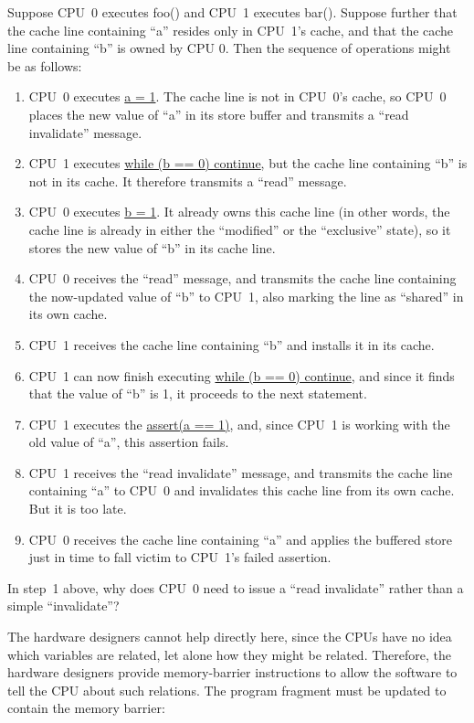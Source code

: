 Suppose CPU~0 executes foo() and CPU~1 executes bar().
Suppose further that the cache line containing ``a'' resides only in CPU~1's
cache, and that the cache line containing ``b'' is owned by CPU 0.
Then the sequence of operations might be as follows:
\begin{enumerate}
\item	CPU~0 executes \url{a = 1}.  The cache line is not in
	CPU~0's cache, so CPU~0 places the new value of ``a'' in its
	store buffer and transmits a ``read invalidate'' message.
\item	CPU~1 executes \url{while (b == 0) continue}, but the cache line
	containing ``b'' is not in its cache.
	It therefore transmits a ``read'' message.
\item	CPU~0 executes \url{b = 1}.
	It already owns this cache line (in other words, the cache line
	is already in either the ``modified'' or the ``exclusive'' state),
	so it stores the new value of ``b'' in its cache line.
\item	CPU~0 receives the ``read'' message, and transmits the
	cache line containing the now-updated value of ``b''
	to CPU~1, also marking the line as ``shared'' in its own cache.
\item	CPU~1 receives the cache line containing ``b'' and installs
	it in its cache.
\item	CPU~1 can now finish executing \url{while (b == 0) continue},
	and since it finds that the value of ``b'' is 1, it proceeds
	to the next statement.
\item	CPU~1 executes the \url{assert(a == 1)}, and, since CPU~1 is
	working with the old value of ``a'', this assertion fails.
\item	CPU~1 receives the ``read invalidate'' message, and
	transmits the cache line containing ``a'' to CPU~0 and
	invalidates this cache line from its own cache.
	But it is too late.
\item	CPU~0 receives the cache line containing ``a'' and applies
	the buffered store just in time to fall victim to CPU~1's
	failed assertion.
\end{enumerate}

\QuickQuiz{}
	In step~1 above, why does CPU~0 need to issue a ``read invalidate''
	rather than a simple ``invalidate''?
 \QuickQuizEnd

The hardware designers cannot help directly here, since the CPUs have
no idea which variables are related, let alone how they might be related.
Therefore, the hardware designers provide memory-barrier instructions
to allow the software to tell the CPU about such relations.
The program fragment must be updated to contain the memory barrier:

